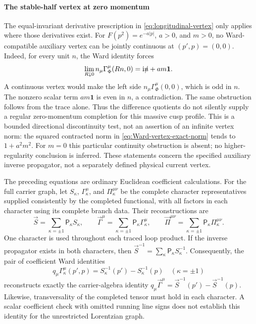 \documentclass[final,5p,times,twocolumn,numbers,nopreprintline]{elsarticle}
\numberwithin{equation}{section}
\theoremstyle{definition}
\theoremstyle{remark}
\newcommand{\ii}{\mathrm i}
\newcommand{\Ph}{\Phi}
\newcommand{\one}{\mathbf 1}
\begin{document}
\paragraph{The stable-half vertex at zero momentum}
The equal-invariant derivative prescription in
\eqref{eq:longitudinal-vertex} only applies where those derivatives
exist. For \(F(p^2)=e^{-a|p|}\), \(a>0\), and \(m>0\),
no Ward-compatible auxiliary vertex can be jointly continuous at
\((p',p)=(0,0)\). Indeed, for every unit \(n\), the Ward identity
forces
\begin{equation}
 \lim_{R\downarrow0}n_\mu\Gamma_\Ph^\mu(Rn,0)
       =\ii\slashed n+am\one.
 \label{eq:stable-half-vertex-origin-limit}
\end{equation}
A continuous vertex would make the left side
\(n_\mu\Gamma_\Ph^\mu(0,0)\), which is odd in \(n\).
The nonzero scalar term \(am\one\) is even in \(n\), a
contradiction. The same obstruction follows from the trace alone.
Thus the difference quotients do not silently supply a regular
zero-momentum completion for this massive cusp profile. This is a
bounded directional discontinuity test, not an assertion of an
infinite vertex norm: the squared contracted norm in
\eqref{eq:Ward-vertex-exact-norm} tends to \(1+a^2m^2\).
For \(m=0\) this particular continuity obstruction
is absent; no higher-regularity conclusion is inferred. These
statements concern the specified auxiliary inverse propagator, not
a separately defined physical current vertex.

The preceding equations are ordinary Euclidean coefficient
calculations. For the full carrier graph, let
\(S_\kappa\), \(\Gamma_\kappa^\mu\), and
\(\Pi_\kappa^{\mu\nu}\) be the complete character
representatives supplied consistently by the completed functional,
with all factors in each character using its complete branch data. Their reconstructions are
\begin{equation}
 \vec S=\sum_{\kappa=\pm1}\mathsf P_{\kappa}S_\kappa,
 \qquad
 \vec\Gamma^\mu=\sum_{\kappa=\pm1}\mathsf P_{\kappa}
                                  \Gamma_\kappa^\mu,
 \qquad
 \vec\Pi^{\mu\nu}=\sum_{\kappa=\pm1}\mathsf P_{\kappa}
                                  \Pi_\kappa^{\mu\nu}.
 \label{eq:QED-character-reconstruction}
\end{equation}
One character is used throughout each traced loop product.
If the inverse propagator exists in both characters, then
\(\vec S^{-1}=\sum_\kappa\mathsf P_{\kappa}S_\kappa^{-1}\).
Consequently, the pair of coefficient Ward identities
\begin{equation}
 q_\mu\Gamma_\kappa^\mu(p',p)
        =S_\kappa^{-1}(p')-S_\kappa^{-1}(p)
 \quad(\kappa=\pm1)
 \label{eq:QED-character-Ward-identities}
\end{equation}
reconstructs exactly the carrier-algebra identity
\(q_\mu\vec\Gamma^\mu
=\vec S^{-1}(p')-\vec S^{-1}(p)\).
Likewise, transversality of the completed tensor must hold in
each character. A scalar coefficient check with omitted running
line signs does not establish this identity for the unrestricted
Lorentzian graph.
\end{document}
